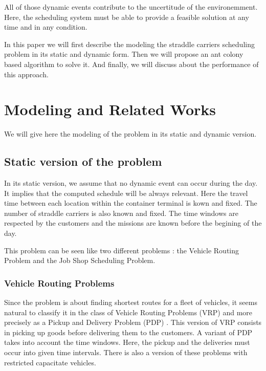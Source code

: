 \documentclass[a4paper,10pt]{article}
\begin{document}
All of those dynamic events contribute to the uncertitude of the environemment. Here, the scheduling system must be able to provide a feasible solution at any time and in any condition.


In this paper we will first describe the modeling the straddle carriers scheduling problem in its static and dynamic form. Then we will propose an ant colony based algorithm to solve it. And finally, we will discuss about the performance of this approach.

\section{Modeling and Related Works}

We will give here the modeling of the problem in its static and dynamic version.

    \subsection{Static version of the problem}

In its static version, we assume that no dynamic event can occur during the day. It implies that the computed schedule will be always relevant. Here the travel time between each location within the container terminal is kown and fixed. The number of straddle carriers is also known and fixed. The time windows are respected by the customers and the missions are known before the begining of the day.

This problem can be seen like two different problems : the Vehicle Routing Problem and the Job Shop Scheduling Problem.

	\subsubsection{Vehicle Routing Problems}
Since the problem is about finding shortest routes for a fleet of vehicles, it seems natural to classify it in the class of Vehicle Routing Problems (VRP)\cite{Toth2001,Laporte1992} and more precisely as a Pickup and Delivery Problem (PDP) \cite{Berbeglia2007}. This version of VRP consists in picking up goods before delivering them to the customers. A variant of PDP takes into account the time windows\cite{Mitrovic1998}. Here, the pickup and the deliveries must occur into given time intervals. There is also a version of these problems with restricted capacitate vehicles\cite{Toth2001}.
\end{document}
